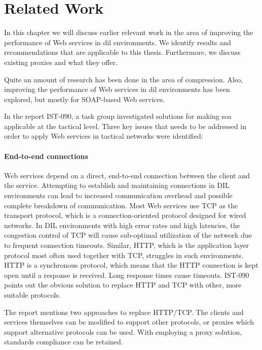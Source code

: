 \chapter{Related Work}

In this chapter we will discuss earlier relevant work in the area of improving
the performance of Web services in \gls{dil} environments. We identify results
and recommendations that are applicable to this thesis. Furthermore, we discuss
existing proxies and what they offer.

Quite an amount of research has been done in the area of compression. Also,
improving the performance of Web services in \gls{dil} environments has been
explored, but mostly for SOAP-based Web services.

In the report IST-090, a task group investigated solutions for making \gls{soa}
applicable at the tactical level. Three key issues that needs to be addressed in
order to apply Web services in tactical networks were
identified\cite{ist-118,ist-090}:

\label{section:DIL-problems}

\subsubsection{End-to-end connections}

Web services depend on a direct, end-to-end connection between the client and
the service. Attempting to establish and maintaining connections in DIL
environments can lead to increased communication overhead and possible complete
breakdown of communication. Most Web services use TCP as the transport protocol,
which is a connection-oriented protocol designed for wired networks. In DIL
environments with high error rates and high latencies, the congestion control of
TCP will cause sub-optimal utilization of the network due to frequent connection
timeouts. Similar, HTTP, which is the application layer protocol most often
used together with TCP, struggles in such environments. HTTP is a synchronous
protocol, which means that the HTTP connection is kept open until a response is
received. Long response times cause timeouts. IST-090 points out the obvious
solution to replace HTTP and TCP with other, more suitable protocols.

The report\cite{ist-090} mentions two approaches to replace HTTP/TCP. The
clients and services themselves can be modified to support other protocols, or
proxies which support alternative protocols can be used. With employing a proxy
solution, standards compliance can be retained.

